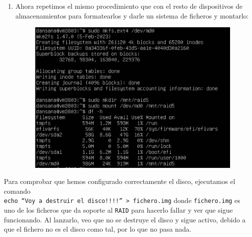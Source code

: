 \documentclass[10pt]{article}
\begin{document}
\begin{enumerate}
\begin{figure}[H]
		\end{figure}
		\item Ahora repetimos el mismo procedimiento que con el resto de dispositivos de almacenamientos para formatearlos y darle un sistema de ficheros y montarlo:
		\begin{figure}[H]
			\setlength{\abovecaptionskip}{0cm}
			\setlength{\belowcaptionskip}{0cm}
			\centering
			\includegraphics[width=0.6\linewidth]{Recursos/mountRAID.png}
		\end{figure}
	\end{enumerate}
	Para comprobar que hemos configurado correctamente el disco, ejecutamos el comando \\ \verb|echo “Voy a destruir el disco!!!!” > fichero.img| donde \verb|fichero.img| es uno de los ficheros que da soporte al \verb|RAID| para hacerlo fallar y ver que sigue funcionando. Al lanzarlo, veo que no se destruye el disco y sigue activo, debido a que el fichero no es el disco como tal, por lo que no pasa nada. 
	
\end{document}
